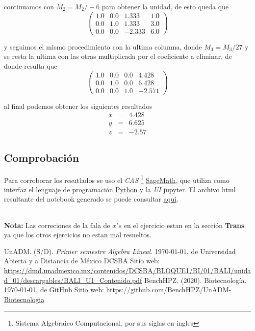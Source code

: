 \documentclass[11pt]{article}
\begin{document}
\begin{multicols}{2}
\begin{enumerate}[\bf{Sistema} 1]
			continuamos con $M_2 = M_2/-6$ para obtener la unidad, de esto queda que
			$$\left(\begin{array}{rrrr}
				1.0 & 0.0 & 1.333 & 1.0 \\
				0.0 & 1.0 & 1.333 & 3.0 \\
				0.0 & 0.0 & -2.333 & 6.0
			\end{array}\right)$$ 
			
			y seguimos el mismo procedimiento con la ultima columna, donde $M_3 = M_3/27$ y se resta la ultima con las otras multiplicada por el coeficiente a eliminar, de donde resulta que
			$$\left(\begin{array}{rrrr}
				1.0 & 0.0 & 0.0 & 4.428 \\
				0.0 & 1.0 & 0.0 & 6.428 \\
				0.0 & 0.0 & 1.0 & -2.571
			\end{array}\right)$$ 
			
			al final podemos obtener los siguientes resultados
			\begin{eqnarray*}
				x &=& 4.428 \\
				y &=& 6.625 \\
				z &=& -2.57
			\end{eqnarray*}	

	\end{enumerate}
\end{multicols}




	\subsection*{Comprobaci\'on}
	\par Para corroborar los resutlados se uso el \textit{CAS} 
\footnote{Sistema Algebraico Computacional, por sus siglas en ingles} 
	\href{https://www.sagemath.org/}{SageMath}, que utiliza como interfaz el lenguaje de programaci\'on \href{https://www.python.org/}{Python} y la \textit{UI} jupyter. El archivo html resultante del notebook generado se puede consultar \href{https://github.com/BenchHPZ/UnADM-Biotecnologia/blob/master/B1-1/BALI/Actividades/BALI_U2_EA_BERC.ipynb}{aqu\'i}.
	\ \\ \ \\
	\par \huge {\bf Nota:} \normalsize Las correciones de la fala de $x's$ en el ejercicio estan en la secci\'on \textbf{Trans} ya que los otros ejercicios no estan mal resueltos.



\newpage
\begin{thebibliography}{X}

	 UnADM. (S/D). \emph{Primer semestre Algebra Lineal}. \today, de Universidad Abierta y a Distancia de México \textbar{} DCSBA Sitio web: \url{https://dmd.unadmexico.mx/contenidos/DCSBA/BLOQUE1/BI/01/BALI/unidad_01/descargables/BALI_U1_Contenido.pdf}
	 BenchHPZ. (2020). Biotecnolog\'ia. \today, de GitHub Sitio web: \url{https://github.com/BenchHPZ/UnADM-Biotecnologia}
	
\end{thebibliography}
\end{document}
